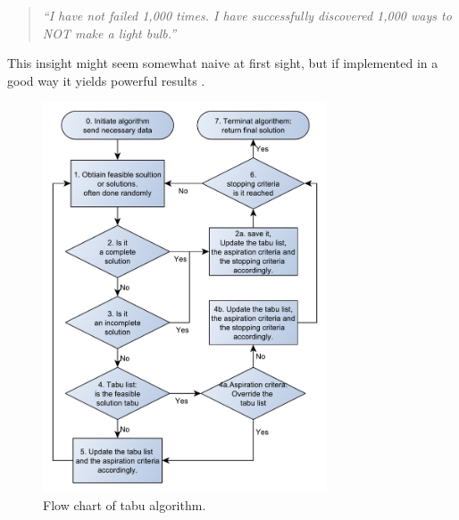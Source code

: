 \begin{quotation}
\emph{``I have not failed 1,000 times.  I have
successfully discovered 1,000 ways to NOT make a light bulb.''}
\end{quotation}
This insight might seem somewhat naive at first sight, but if implemented in a good way it yields powerful results \cite{canada}.
\begin{figure}[!h]
	\centering
	\includegraphics[width=0.75\textwidth,height=0.70\textheight]{chapter_4_methods/ny_generel}
  	\caption[Generic flow chart of tabu algorithm]
  	{Flow chart of tabu algorithm.}
	\label{t1}
\end{figure}


